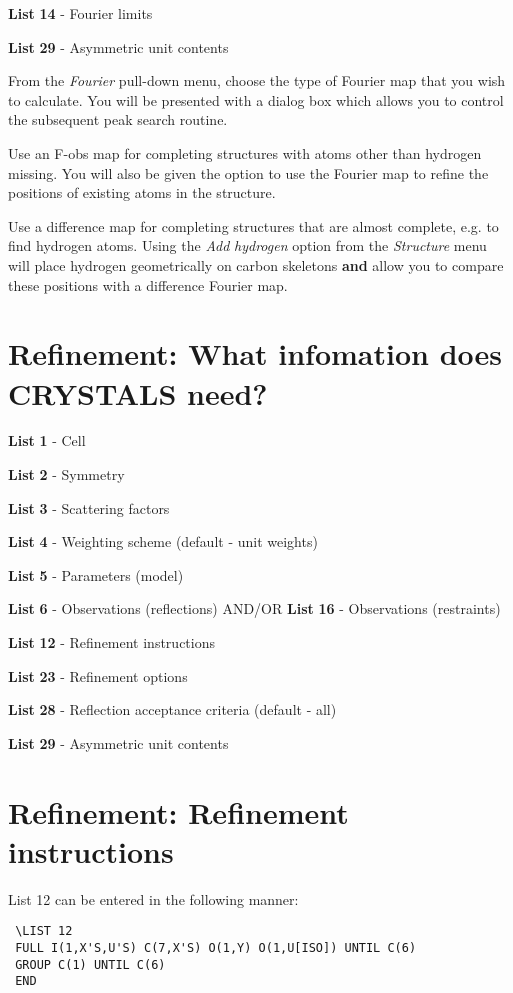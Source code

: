 \documentclass[10pt,a4paper]{report}
\begin{document}
 {\bf List} {\bf 14} - Fourier limits


 {\bf List} {\bf 29} - Asymmetric unit contents


 From the \emph{Fourier} pull-down menu, choose the type of Fourier
map that you wish to calculate. You will be presented with a
dialog box which allows you to control the subsequent peak
search routine.


 Use an F-obs map for completing structures with atoms other
than hydrogen missing. You will also be given the option to use the
Fourier map to refine the positions of existing atoms in the structure.


 Use a difference map for completing structures that are almost
complete, e.g. to find hydrogen atoms. Using the \emph{Add}
\emph{hydrogen} option from the \emph{Structure} menu will place hydrogen
geometrically on carbon skeletons {\bf and} allow you to compare
these positions with a difference Fourier map.

\section{Refinement: What infomation does CRYSTALS need?}



 {\bf List} {\bf 1} - Cell


 {\bf List} {\bf 2} - Symmetry


 {\bf List} {\bf 3} - Scattering factors


 {\bf List} {\bf 4} - Weighting scheme (default - unit weights)


 {\bf List} {\bf 5} - Parameters (model)


 {\bf List} {\bf 6} - Observations (reflections) AND/OR {\bf List} {\bf 16} - Observations (restraints)


 {\bf List} {\bf 12} - Refinement instructions


 {\bf List} {\bf 23} - Refinement options


 {\bf List} {\bf 28} - Reflection acceptance criteria (default - all)


 {\bf List} {\bf 29} - Asymmetric unit contents

\section{Refinement: Refinement instructions}



List 12 can be entered in the following manner:
\small\begin{verbatim}
 \LIST 12
 FULL I(1,X'S,U'S) C(7,X'S) O(1,Y) O(1,U[ISO]) UNTIL C(6)
 GROUP C(1) UNTIL C(6)
 END
\end{verbatim}\normalsize
\end{document}
